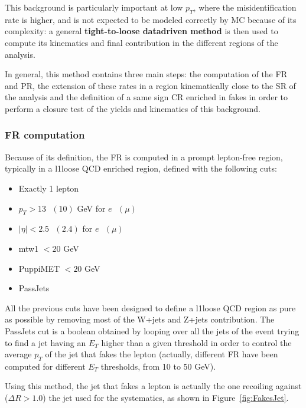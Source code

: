 \documentclass[a4paper, 10pt, openright]{report}
\begin{document}
This background is particularly important at low $p_T$, where the misidentification rate is higher, and is not expected to be modeled correctly by \ac{MC} because of its complexity: a general \textbf{tight-to-loose datadriven method} is then used to compute its kinematics and final contribution in the different regions of the analysis. 

In general, this method contains three main steps: the computation of the \ac{FR} and \ac{PR}, the extension of these rates in a region kinematically close to the \ac{SR} of the analysis and the definition of a same sign \ac{CR} enriched in fakes in order to perform a closure test of the yields and kinematics of this background.%

\subsubsection*{\acf{FR} computation}

Because of its definition, the \ac{FR} is computed in a prompt lepton-free region, typically in a l1loose \ac{QCD} enriched region, defined with the following cuts:
\begin{multicols}{2}
\begin{itemize}
\item Exactly 1 lepton
\item $p_{T} > 13 \text{ } (10)$ GeV for $e \text{ }(\mu)$ 
\item $|\eta| < 2.5 \text{ } (2.4)$ for $e \text{ }(\mu)$ 
\item mtw1 $< 20$ GeV
\item PuppiMET $< 20$ GeV
\item PassJets
\end{itemize}
\end{multicols}

All the previous cuts have been designed to define a l1loose \ac{QCD} region as pure as possible by removing most of the W+jets and Z+jets contribution. The PassJets cut is a boolean obtained by looping over all the jets of the event trying to find a jet having an $E_T$ higher than a given threshold in order to control the average $p_T$ of the jet that fakes the lepton (actually, different \ac{FR} have been computed for different $E_T$ thresholds, from 10 to 50 GeV). 

Using this method, the jet that fakes a lepton is actually the one recoiling against ($\Delta R > 1.0$) the jet used for the systematics, as shown in Figure~\ref{fig:FakesJet}.
\end{document}
